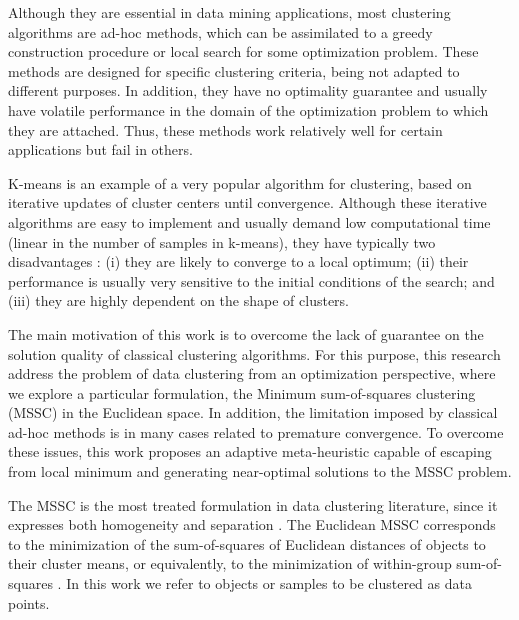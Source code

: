 Although they are essential in data mining applications, most clustering algorithms are ad-hoc methods, which can be assimilated to a greedy construction procedure or local search for some optimization problem. These methods are designed for specific clustering criteria, being not adapted to different purposes. In addition, they have no optimality guarantee and usually have volatile performance in the domain of the optimization problem to which they are attached. Thus, these methods work relatively well for certain applications but fail in others.

K-means is an example of a very popular algorithm for clustering, based on iterative updates of cluster centers until convergence. Although these iterative algorithms are easy to implement and usually demand low computational time (linear in the number of samples in k-means), they have typically two disadvantages \cite{Das2009}: (i) they are likely to converge to a local optimum; (ii) their performance is usually very sensitive to the initial conditions of the search; and (iii) they are highly dependent on the shape of clusters.

The main motivation of this work is to overcome the lack of guarantee on the solution quality of classical clustering algorithms. For this purpose, this research address the problem of data clustering from an optimization perspective, where we explore a particular formulation, the Minimum sum-of-squares clustering (MSSC) in the Euclidean space. In addition, the limitation imposed by classical ad-hoc methods is in many cases related to premature convergence. To overcome these issues, this work proposes an adaptive meta-heuristic capable of escaping from local minimum and generating near-optimal solutions to the MSSC problem.

The MSSC is the most treated formulation in data clustering literature, since it expresses both homogeneity and separation \cite{Hansen2009}. The Euclidean MSSC corresponds to the minimization of the sum-of-squares of Euclidean distances of objects to their cluster means, or equivalently, to the minimization of within-group sum-of-squares \cite{Xavier2011}. In this work we refer to objects or samples to be clustered as data points.


